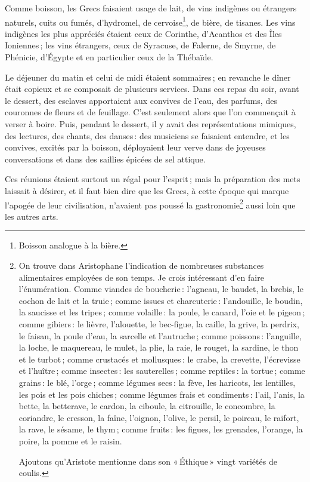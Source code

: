 Comme boisson, les Grecs faisaient usage de lait, de vins indigènes ou
étrangers naturels, cuits ou fumés, d'hydromel, de cervoise\footnote{Boisson
analogue à la bière.}, de bière, de tisanes. Les vins indigènes les plus
appréciés étaient ceux de Corinthe, d'Acanthos et des Îles Ioniennes ; les vins
étrangers, ceux de Syracuse, de Falerne, de Smyrne, de Phénicie, d'Égypte et en
particulier ceux de la Thébaïde.

Le déjeuner du matin et celui de midi étaient sommaires ; en revanche le dîner
était copieux et se composait de plusieurs services. Dans ces repas du soir,
avant le dessert, des esclaves apportaient aux convives de l'eau, des parfums,
des couronnes de fleurs et de feuillage. C'est seulement alors que l’on
commençait à verser à boire. Puis, pendant le dessert, il y avait des
représentations mimiques, des lectures, des chants, des danses : des musiciens
se faisaient entendre, et les convives, excités par la boisson, déployaient
leur verve dans de joyeuses conversations et dans des saillies épicées de sel
attique.

Ces réunions étaient surtout un régal pour l'esprit ; mais la préparation des
mets laissait à désirer, et il faut bien dire que les Grecs, à cette époque qui
marque l'apogée de leur civilisation, n'avaient pas poussé la
gastronomie\footnote{On trouve dans Aristophane l'indication de nombreuses
substances alimentaires employées de son temps. Je crois intéressant d'en faire
l'énumération. Comme viandes de boucherie : l'agneau, le baudet, la brebis, le
cochon de lait et la truie ; comme issues et charcuterie : l'andouille, le
boudin, la saucisse et les tripes ; comme volaille : la poule, le canard, l'oie
et le pigeon ; comme gibiers : le lièvre, l'alouette, le bec-figue, la caille,
la grive, la perdrix, le faisan, la poule d'eau, la sarcelle et l'autruche ;
comme poissons : l'anguille, la loche, le maquereau, le mulet, la plie, la
raie, le rouget, la sardine, le thon et le turbot ; comme crustacés et
mollusques : le crabe, la crevette, l'écrevisse et l'huître ; comme insectes :
les sauterelles ; comme reptiles : la tortue ; comme grains : le blé, l'orge ;
comme légumes secs : la fève, les haricots, les lentilles, les pois et les pois
chiches ; comme légumes frais et condiments : l'ail, l'anis, la bette, la
betterave, le cardon, la ciboule, la citrouille, le concombre, la coriandre, le
cresson, la faîne, l'oignon, l'olive, le persil, le poireau, le raifort, la
rave, le sésame, le thym ; comme fruits : les figues, les grenades, l'orange,
la poire, la pomme et le raisin.

Ajoutons qu'Aristote mentionne dans son « Éthique » vingt variétés de coulis.}
aussi loin que les autres arts.

